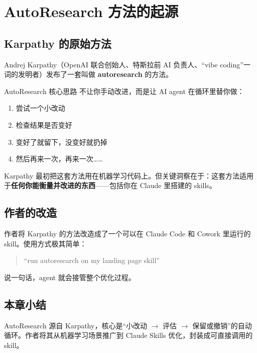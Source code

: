 \section{AutoResearch 方法的起源}

\subsection{Karpathy 的原始方法}

Andrej Karpathy（OpenAI 联合创始人、特斯拉前 AI 负责人、``vibe coding''一词的发明者）发布了一套叫做 \textbf{autoresearch} 的方法。

\begin{importantbox}{AutoResearch 核心思路}
不让你手动改进，而是让 AI agent 在循环里替你做：
\begin{enumerate}
    \item 尝试一个小改动
    \item 检查结果是否变好
    \item 变好了就留下，没变好就扔掉
    \item 然后再来一次，再来一次……
\end{enumerate}
\end{importantbox}

Karpathy 最初把这套方法用在机器学习代码上。但关键洞察在于：这套方法适用于\textbf{任何你能衡量并改进的东西}——包括你在 Claude 里搭建的 skills。

\subsection{作者的改造}

作者将 Karpathy 的方法改造成了一个可以在 Claude Code 和 Cowork 里运行的 skill。使用方式极其简单：

\begin{quote}
``run autoresearch on my landing page skill''
\end{quote}

说一句话，agent 就会接管整个优化过程。

\subsection{本章小结}

AutoResearch 源自 Karpathy，核心是``小改动 $\to$ 评估 $\to$ 保留或撤销''的自动循环。作者将其从机器学习场景推广到 Claude Skills 优化，封装成可直接调用的 skill。

